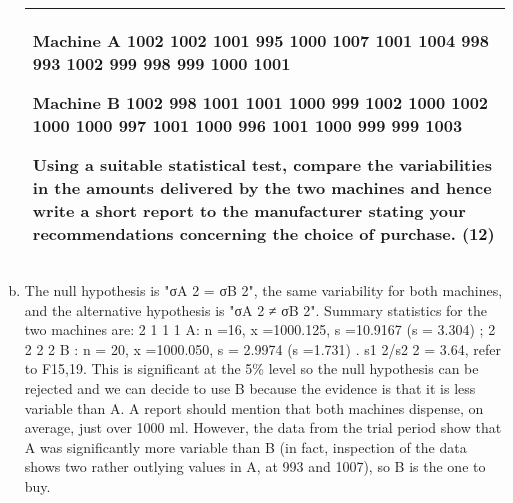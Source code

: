 \documentclass[a4paper,12pt]{article}
\begin{document}
\begin{enumerate}[(a)]
\begin{table}[ht!]
\begin{tabular}{|p{15cm}|}
 
Machine A 
 1002   1002   1001   995   1000   1007   1001   1004   998   993   1002   999 998   999   1000   1001 
 
 
Machine B 
 1002   998   1001   1001   1000   999   1002   1000   1002   1000   1000   997 1001   1000   996   1001   1000   999   999   1003 
 
 
Using a suitable statistical test, compare the variabilities in the amounts delivered by the two machines and hence write a short report to the manufacturer stating your recommendations concerning the choice of purchase. (12) 

\\ \hline
  
\end{tabular}

\end{table}
\item  The null hypothesis is "σA
2 = σB
2", the same variability for both machines, and
the alternative hypothesis is "σA
2 ≠ σB
2".
Summary statistics for the two machines are:
2
1 1 1 A: n =16, x =1000.125, s =10.9167 (s = 3.304) ;
2
2 2 2 B : n = 20, x =1000.050, s = 2.9974 (s =1.731) .
s1
2/s2
2 = 3.64, refer to F15,19. This is significant at the 5\% level so the null
hypothesis can be rejected and we can decide to use B because the evidence is
that it is less variable than A.
A report should mention that both machines dispense, on average, just over
1000 ml. However, the data from the trial period show that A was
significantly more variable than B (in fact, inspection of the data shows two
rather outlying values in A, at 993 and 1007), so B is the one to buy.
\end{enumerate}
\end{document}
